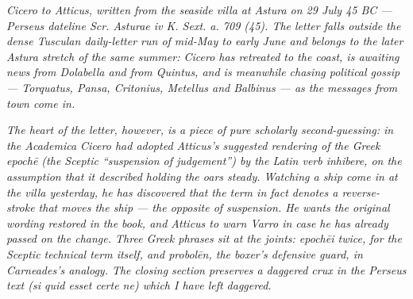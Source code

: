 
\textit{Cicero to Atticus, written from the seaside villa at Astura
on 29 July 45 BC --- Perseus dateline \textit{Scr. Asturae iv K.
Sext. a. 709 (45)}. The letter falls outside the dense Tusculan
daily-letter run of mid-May to early June and belongs to the later
Astura stretch of the same summer: Cicero has retreated to the coast,
is awaiting news from Dolabella and from Quintus, and is meanwhile
chasing political gossip --- Torquatus, Pansa, Critonius, Metellus
and Balbinus --- as the messages from town come in.}

\textit{The heart of the letter, however, is a piece of pure
scholarly second-guessing: in the \textit{Academica} Cicero had
adopted Atticus's suggested rendering of the Greek
\textit{epoch\=e} (the Sceptic ``suspension of judgement'') by the
Latin verb \textit{inhibere}, on the assumption that it described
holding the oars steady. Watching a ship come in at the villa
yesterday, he has discovered that the term in fact denotes a
reverse-stroke that moves the ship --- the opposite of suspension.
He wants the original wording restored in the book, and Atticus
to warn Varro in case he has already passed on the change. Three
Greek phrases sit at the joints: \textit{epoch\=ei} twice, for
the Sceptic technical term itself, and \textit{probol\=en}, the
boxer's defensive guard, in Carneades's analogy. The closing
section preserves a daggered crux in the Perseus text
(\textit{si quid \dag{}esset certe ne\dag{}}) which I have left
daggered.}
